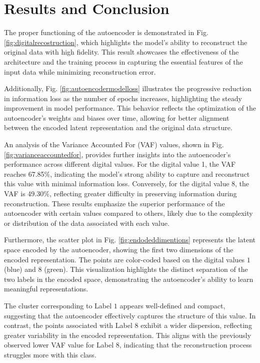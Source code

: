 \documentclass[9pt,technote]{IEEEtran}
\begin{document}
\section{Results and Conclusion}
The proper functioning of the autoencoder is demonstrated in Fig. \ref{fig:digitalrecostruction}, which highlights the model's ability to reconstruct the original data with high fidelity. This result showcases the effectiveness of the architecture and the training process in capturing the essential features of the input data while minimizing reconstruction error.

Additionally, Fig. \ref{fig:autoencodermodelloss} illustrates the progressive reduction in information loss as the number of epochs increases, highlighting the steady improvement in model performance. This behavior reflects the optimization of the autoencoder's weights and biases over time, allowing for better alignment between the encoded latent representation and the original data structure.

An analysis of the Variance Accounted For (VAF) values, shown in Fig. \ref{fig:varianceaccountedfor}, provides further insights into the autoencoder's performance across different digital values. For the digital value 1, the VAF reaches 67.85$\%$, indicating the model's strong ability to capture and reconstruct this value with minimal information loss. Conversely, for the digital value 8, the VAF is 49.30$\%$, reflecting greater difficulty in preserving information during reconstruction. These results emphasize the superior performance of the autoencoder with certain values compared to others, likely due to the complexity or distribution of the data associated with each value.

Furthermore, the scatter plot in Fig. \ref{fig:endodeddimentions} represents the latent space encoded by the autoencoder, showing the first two dimensions of the encoded representation. The points are color-coded based on the digital values $1$ (blue) and $8$ (green). This visualization highlights the distinct separation of the two labels in the encoded space, demonstrating the autoencoder's ability to learn meaningful representations.

The cluster corresponding to Label $1$ appears well-defined and compact, suggesting that the autoencoder effectively captures the structure of this value. In contrast, the points associated with Label $8$ exhibit a wider dispersion, reflecting greater variability in the encoded representation. This aligns with the previously observed lower VAF value for Label $8$, indicating that the reconstruction process struggles more with this class.
\end{document}
